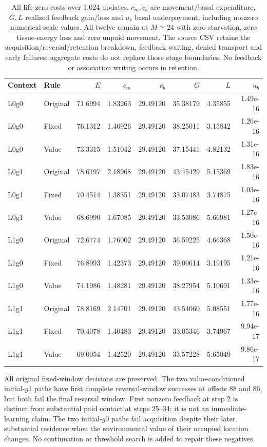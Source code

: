 \begin{table}[htbp]\centering\scriptsize
\caption{All life-zero costs over 1,024 updates. $c_m,c_b$ are movement/basal expenditure, $G,L$ realized feedback gain/loss and $u_b$ basal underpayment, including nonzero numerical-scale values. All twelve remain at $M\simeq24$ with zero starvation, zero tissue-energy loss and zero unpaid movement. The source CSV retains the acquisition/reversal/retention breakdown, feedback waiting, denied transport and early failures; aggregate costs do not replace those stage boundaries. No feedback or association writing occurs in retention.}\label{tab:brake-costs}
\setlength{\tabcolsep}{4pt}\begin{tabular}{llrrrrrr}\toprule
Context & Rule & $E$ & $c_m$ & $c_b$ & $G$ & $L$ & $u_b$\\\midrule
L0g0 & Original & 71.6994 & 1.83263 & 29.49120 & 35.38179 & 4.35855 & 1.49e-16 \\
L0g0 & Fixed & 76.1312 & 1.46926 & 29.49120 & 38.25011 & 3.15842 & 1.26e-16 \\
L0g0 & Value & 73.3315 & 1.51042 & 29.49120 & 37.15441 & 4.82132 & 1.31e-16 \\
L0g1 & Original & 78.6197 & 2.18968 & 29.49120 & 43.45429 & 5.15369 & 1.83e-16 \\
L0g1 & Fixed & 70.4514 & 1.38351 & 29.49120 & 33.07483 & 3.74875 & 1.03e-16 \\
L0g1 & Value & 68.6990 & 1.67085 & 29.49120 & 33.53086 & 5.66981 & 1.27e-16 \\
L1g0 & Original & 72.6774 & 1.76002 & 29.49120 & 36.59225 & 4.66368 & 1.50e-16 \\
L1g0 & Fixed & 76.8993 & 1.42373 & 29.49120 & 39.00614 & 3.19195 & 1.21e-16 \\
L1g0 & Value & 74.1986 & 1.48281 & 29.49120 & 38.27954 & 5.10691 & 1.33e-16 \\
L1g1 & Original & 78.8169 & 2.14701 & 29.49120 & 43.54060 & 5.08551 & 1.77e-16 \\
L1g1 & Fixed & 70.4078 & 1.40483 & 29.49120 & 33.05346 & 3.74967 & 9.94e-17 \\
L1g1 & Value & 69.0054 & 1.42520 & 29.49120 & 33.57228 & 5.65049 & 9.86e-17 \\
\bottomrule\end{tabular}\end{table}\FloatBarrier

All original fixed-window decisions are preserved. The two value-conditioned initial-$g1$ paths have first complete reversal-window successes at offsets 88 and 86, but both fail the final reversal window. First nonzero feedback at step 2 is distinct from substantial paid contact at steps 25--34; it is not an immediate-learning claim. The two initial-$g0$ paths fail acquisition despite their later substantial residence when the environmental value of their occupied location changes. No continuation or threshold search is added to repair these negatives.
